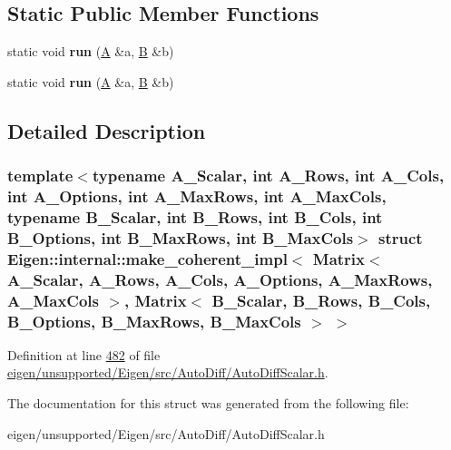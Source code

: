 \subsection*{Static Public Member Functions}
\begin{DoxyCompactItemize}
\item 
\mbox{\label{struct_eigen_1_1internal_1_1make__coherent__impl_3_01_matrix_3_01_a___scalar_00_01_a___rows_00_02c107ffcc218caac688e11f3e382ff61_a439d054bc6c744d11e24361cb589ac92}} 
static void {\bfseries run} (\hyperlink{group___core___module_class_eigen_1_1_matrix}{A} \&a, \hyperlink{group___core___module_class_eigen_1_1_matrix}{B} \&b)
\item 
\mbox{\label{struct_eigen_1_1internal_1_1make__coherent__impl_3_01_matrix_3_01_a___scalar_00_01_a___rows_00_02c107ffcc218caac688e11f3e382ff61_a439d054bc6c744d11e24361cb589ac92}} 
static void {\bfseries run} (\hyperlink{group___core___module_class_eigen_1_1_matrix}{A} \&a, \hyperlink{group___core___module_class_eigen_1_1_matrix}{B} \&b)
\end{DoxyCompactItemize}


\subsection{Detailed Description}
\subsubsection*{template$<$typename A\+\_\+\+Scalar, int A\+\_\+\+Rows, int A\+\_\+\+Cols, int A\+\_\+\+Options, int A\+\_\+\+Max\+Rows, int A\+\_\+\+Max\+Cols, typename B\+\_\+\+Scalar, int B\+\_\+\+Rows, int B\+\_\+\+Cols, int B\+\_\+\+Options, int B\+\_\+\+Max\+Rows, int B\+\_\+\+Max\+Cols$>$\newline
struct Eigen\+::internal\+::make\+\_\+coherent\+\_\+impl$<$ Matrix$<$ A\+\_\+\+Scalar, A\+\_\+\+Rows, A\+\_\+\+Cols, A\+\_\+\+Options, A\+\_\+\+Max\+Rows, A\+\_\+\+Max\+Cols $>$, Matrix$<$ B\+\_\+\+Scalar, B\+\_\+\+Rows, B\+\_\+\+Cols, B\+\_\+\+Options, B\+\_\+\+Max\+Rows, B\+\_\+\+Max\+Cols $>$ $>$}



Definition at line \hyperlink{eigen_2unsupported_2_eigen_2src_2_auto_diff_2_auto_diff_scalar_8h_source_l00482}{482} of file \hyperlink{eigen_2unsupported_2_eigen_2src_2_auto_diff_2_auto_diff_scalar_8h_source}{eigen/unsupported/\+Eigen/src/\+Auto\+Diff/\+Auto\+Diff\+Scalar.\+h}.



The documentation for this struct was generated from the following file\+:\begin{DoxyCompactItemize}
\item 
eigen/unsupported/\+Eigen/src/\+Auto\+Diff/\+Auto\+Diff\+Scalar.\+h\end{DoxyCompactItemize}
